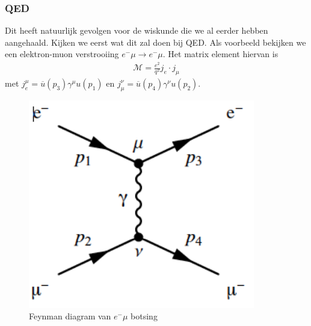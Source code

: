 \documentclass[../main.tex]{subfiles}
\begin{document}
\subsubsection{QED}%
\label{ssub:qed}

Dit heeft natuurlijk gevolgen voor de wiskunde die we al eerder hebben aangehaald. Kijken we eerst wat dit zal doen bij QED. Als voorbeeld bekijken we een elektron-muon verstrooiing $e^-\mu\rightarrow e^-\mu$. Het matrix element hiervan is 
\begin{equation}
    \begin{aligned}
        \label{eq:e_mu_pariteit}
        \mathcal{M}= \frac{e^2}{q^2} j_e\cdot j_\mu
    \end{aligned}
\end{equation}
met $j_e^\mu = \overline u(p_3)\gamma^\mu u(p_1)$ en $j_\mu^\nu = \overline u(p_4)\gamma^\nu u(p_2)$.

\begin{figure}[h]
    \centering
    \includegraphics[width=0.4\linewidth]{parity_violation/diagram_e_mu.png}
    \caption{Feynman diagram van $e^- \mu$ botsing}%
    \label{fig:parity_violation/diagram_e_mu}
\end{figure}
\end{document}
